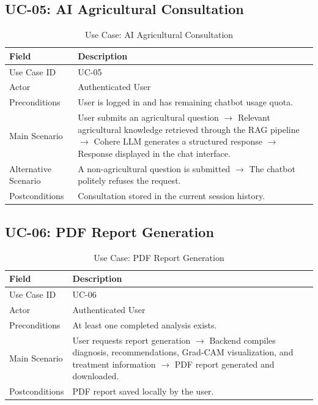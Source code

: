 \subsection{UC-05: AI Agricultural Consultation}

\begin{table}[H]
\centering
\caption{Use Case: AI Agricultural Consultation}
\renewcommand{\arraystretch}{1.4}
\begin{tabularx}{\textwidth}{l X}
\toprule
\textbf{Field} & \textbf{Description}\\
\midrule
Use Case ID & UC-05\\
Actor & Authenticated User\\
Preconditions & User is logged in and has remaining chatbot usage quota.\\
Main Scenario &
User submits an agricultural question $\rightarrow$
Relevant agricultural knowledge retrieved through the RAG pipeline $\rightarrow$
Cohere LLM generates a structured response $\rightarrow$
Response displayed in the chat interface.\\
Alternative Scenario &
A non-agricultural question is submitted $\rightarrow$
The chatbot politely refuses the request.\\
Postconditions &
Consultation stored in the current session history.\\
\bottomrule
\end{tabularx}
\end{table}

\subsection{UC-06: PDF Report Generation}

\begin{table}[H]
\centering
\caption{Use Case: PDF Report Generation}
\renewcommand{\arraystretch}{1.4}
\begin{tabularx}{\textwidth}{l X}
\toprule
\textbf{Field} & \textbf{Description}\\
\midrule
Use Case ID & UC-06\\
Actor & Authenticated User\\
Preconditions & At least one completed analysis exists.\\
Main Scenario &
User requests report generation $\rightarrow$
Backend compiles diagnosis, recommendations, Grad-CAM visualization, and treatment information $\rightarrow$
PDF report generated and downloaded.\\
Postconditions &
PDF report saved locally by the user.\\
\bottomrule
\end{tabularx}
\end{table}

